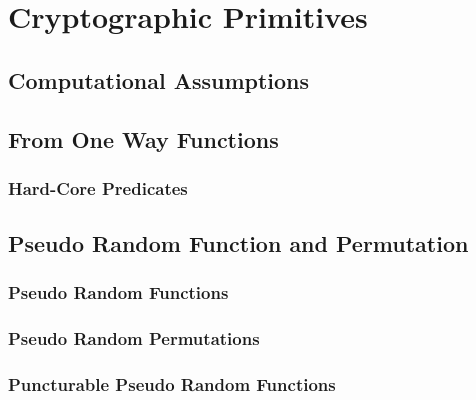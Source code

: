 








\maketitle

\ifTableOfContents 
	\tableofcontents
	\newpage
\fi


\part{Cryptographic Primitives}
\chapter{Computational Assumptions}

\chapter{From One Way Functions}
	\section{Hard-Core Predicates}
	

\chapter{Pseudo Random Function and Permutation}
	\section{Pseudo Random Functions}
	
	
	
	\section{Pseudo Random Permutations}
	
	\section{Puncturable Pseudo Random Functions}
	
	
